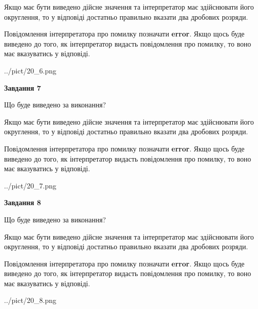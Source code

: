 \documentclass[12pt, ukrainian]{article}
\begin{document}
{\begin {Large}
Якщо має бути виведено дійсне значення та інтерпретатор має здійснювати його округлення, 
то у відповіді достатньо правильно вказати два дробових розряди.

Повідомлення інтерпретатора про помилку позначати \textbf{error}.
Якщо щось буде виведено до того, як інтерпретатор видасть повідомлення про помилку, 
то воно має вказуватись у відповіді. \par

\begin{center}
	{../pict/20_6.png}
\end{center}
\newpage

{\begin {center}\textbf{Завдання 7}\end {center}}\par
Що буде виведено за виконання? \par

Якщо має бути виведено дійсне значення та інтерпретатор має здійснювати його округлення, 
то у відповіді достатньо правильно вказати два дробових розряди.

Повідомлення інтерпретатора про помилку позначати \textbf{error}.
Якщо щось буде виведено до того, як інтерпретатор видасть повідомлення про помилку, 
то воно має вказуватись у відповіді. \par

\begin{center}
	{../pict/20_7.png}
\end{center}
\newpage

{\begin {center}\textbf{Завдання 8}\end {center}}\par
Що буде виведено за виконання? \par

Якщо має бути виведено дійсне значення та інтерпретатор має здійснювати його округлення, 
то у відповіді достатньо правильно вказати два дробових розряди.

Повідомлення інтерпретатора про помилку позначати \textbf{error}.
Якщо щось буде виведено до того, як інтерпретатор видасть повідомлення про помилку, 
то воно має вказуватись у відповіді. \par

\begin{center}
	{../pict/20_8.png}
\end{center}
\newpage


\end{Large}}
\end{document}
